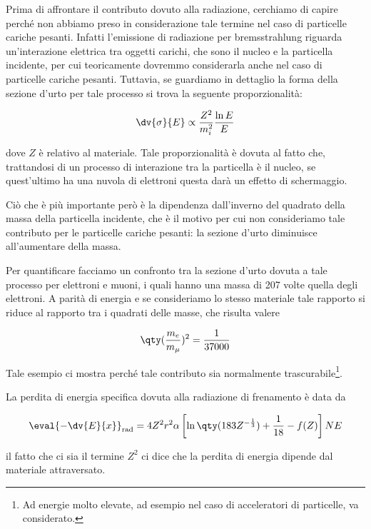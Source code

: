 Prima di affrontare il contributo dovuto alla radiazione, cerchiamo di capire perché non abbiamo preso in considerazione tale termine nel caso di particelle cariche pesanti. Infatti l'emissione di radiazione per bremsstrahlung riguarda un'interazione elettrica tra oggetti carichi, che sono il nucleo e la particella incidente, per cui teoricamente dovremmo considerarla anche nel caso di particelle cariche pesanti. Tuttavia, se guardiamo in dettaglio la forma della sezione d'urto per tale processo si trova la seguente proporzionalità:

\begin{equation*}
    \dv{\sigma}{E} \propto \frac{Z^2}{m_i^2} \frac{\ln{E}}{E}
\end{equation*}

dove $Z$ è relativo al materiale. Tale proporzionalità è dovuta al fatto che, trattandosi di un processo di interazione tra la particella è il nucleo, se quest'ultimo ha una nuvola di elettroni questa darà un effetto di schermaggio.

Ciò che è più importante però è la dipendenza dall'inverno del quadrato della massa della particella incidente, che è il motivo per cui non consideriamo tale contributo per le particelle cariche pesanti: la sezione d'urto diminuisce all'aumentare della massa.

Per quantificare facciamo un confronto tra la sezione d'urto dovuta a tale processo per elettroni e muoni, i quali hanno una massa di 207 volte quella degli elettroni. A parità di energia e se consideriamo lo stesso materiale tale rapporto si riduce al rapporto tra i quadrati delle masse, che risulta valere

\begin{equation*}
    \qty(\frac{m_{e}}{m_{\mu}})^2
    =\frac{1}{37000}
\end{equation*}

Tale esempio ci mostra perché tale contributo sia normalmente trascurabile\footnote{Ad energie molto elevate, ad esempio nel caso di acceleratori di particelle, va considerato.}.

La perdita di energia specifica dovuta alla radiazione di frenamento è data da

\begin{equation*}
    \eval{-\dv{E}{x}}_{\rm rad}
    =4 Z^2 r^2 \alpha \left[ \ln{\qty(183Z^{-\frac{1}{3}})} + \frac{1}{18} - f(Z) \right]NE
\end{equation*}

il fatto che ci sia il termine $Z^2$ ci dice che la perdita di energia dipende dal materiale attraversato.


